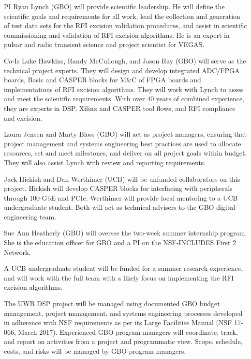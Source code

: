 \documentclass[10pt]{myNSF}
\begin{document}
\label{sec:team}
\vspace{-1em}
\begin{itemize*}
\item{PI Ryan Lynch (GBO) will provide scientific leadership.  He will
  define the scientific goals and requirements for all work, lead the
  collection and generation of test data sets for the RFI excision
  validation procedures, and assist in scientific commissioning and
  validation of RFI excision algorithms.  He is an expert in pulsar
  and radio transient science and project scientist for VEGAS.}
\item{Co-Is Luke Hawkins, Randy McCullough, and Jason Ray (GBO) will
  serve as the technical project experts.  They will design and
  develop integrated ADC/FPGA boards, Basic and CASPER blocks for M\&C
  of FPGA boards and implementations of RFI excision algorithms.  They
  will work with Lynch to asses and meet the scientific requirements.
  With over 40 years of combined experience, they are experts in DSP,
  Xilinx and CASPER tool flows, and RFI compliance and excision.}
\item{Laura Jensen and Marty Bloss (GBO) will act as project managers,
  ensuring that project management and systems engineering best
  practices are used to allocate resources, set and meet milestones,
  and deliver on all project goals within budget.  They will also
  assist Lynch with review and reporting requirements.}
\item{Jack Hickish and Dan Werthimer (UCB) will be unfunded
  collaborators on this project.  Hickish will develop CASPER blocks
  for interfacing with peripherals through 100-GbE and PCIe.
  Werthimer will provide local mentoring to a UCB undergraduate
  student.  Both will act as technical advisers to the GBO digital
  engineering team.}
\item{Sue Ann Heatherly (GBO) will oversee the two-week summer
  internship program.  She is the education officer for GBO and a PI
  on the NSF-INCLUDES First 2 Network.}
\item{A UCB undergraduate student will be funded for a summer research
  experience, and will work with the full team with a likely focus on
  implementing the RFI excision algorithms.}
\end{itemize*}
 
\label{sec:organization}

The UWB DSP project will be managed using documented GBO budget
management, project management, and systems engineering processes
developed in adherence with NSF requirements as per its Large
Facilities Manual (NSF 17-066, March 2017). Experienced GBO program
managers will coordinate, track, and report on activities from a
project and programmatic view.  Scope, schedule, costs, and risks will
be managed by GBO program managers.
\end{document}
